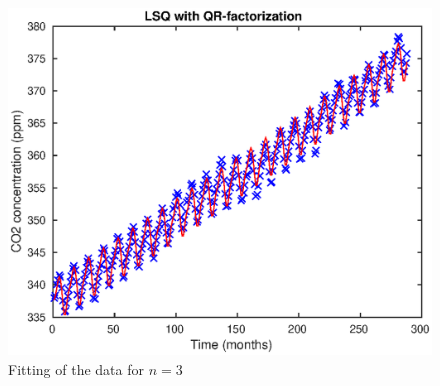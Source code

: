 \begin{figure}
\begin{center}
\includegraphics[scale=0.5]{lsp.eps}
\caption{Fitting of the data for $n=3$}
\label{lsp}
\end{center}
\end{figure}
